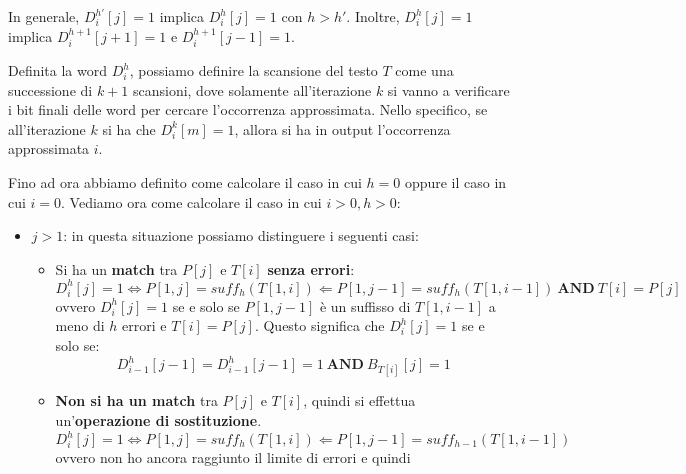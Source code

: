 \begin{nota}
    In generale, $D_i^{h'}[j] = 1$ implica $D_i^{h}[j] = 1$ con $h > h'$.
    Inoltre, $D_{i}^{h} [j] = 1$ implica $D_{i}^{h + 1}[j + 1] = 1$ e
    $D_{i}^{h + 1}[j - 1] = 1$.
\end{nota}
Definita la word $D_i^h$, possiamo definire la scansione del testo $T$ come una
successione di $k + 1$ scansioni, dove solamente all'iterazione $k$ si vanno a
verificare i bit finali delle word per cercare l'occorrenza approssimata.
Nello specifico, se all'iterazione $k$ si ha che $D_i^k[m] = 1$, allora si ha in
output l'occorrenza approssimata $i$.

Fino ad ora abbiamo definito come calcolare il caso in cui $h = 0$ oppure il
caso in cui $i = 0$. Vediamo ora come calcolare il caso in cui $i > 0, h > 0$:
\begin{itemize}
    \item $j > 1$: in questa situazione possiamo distinguere i seguenti casi:
          \begin{itemize}
              \item Si ha un \textbf{match} tra $P[j]$ e $T[i]$ \textbf{senza
                        errori}:
                    \begin{equation}
                        D_i^h[j] = 1 \iff P[1, j] = suff_h(T[1, i]) \Leftarrow
                        P[1, j - 1] = suff_h(T[1, i - 1]) \  \textbf{AND} \ T[i]
                        = P[j]
                    \end{equation}
                    ovvero $D_i^h[j] = 1$ se e solo se $P[1, j - 1]$ è un
                    suffisso di $T[1, i - 1]$ a meno di $h$ errori e $T[i] =
                        P[j]$. Questo significa che $D_i^h[j] = 1$ se e solo se:
                    \begin{equation}
                        D_{i - 1}^h[j - 1] = D_{i - 1}^h [j - 1] = 1 \
                        \textbf{AND} \ B_{T[i]} [j] =  1
                    \end{equation}
              \item \textbf{Non si ha un match} tra $P[j]$ e $T[i]$,
                    quindi si effettua un'\textbf{operazione di sostituzione}.
                    \begin{equation}
                        D_i^h[j] = 1 \iff P[1, j] = suff_h(T[1, i]) \Leftarrow
                        P[1, j - 1] = suff_{h - 1}(T[1, i - 1])
                    \end{equation}
                    ovvero non ho ancora raggiunto il limite di errori e quindi

\end{itemize}
\end{itemize}
